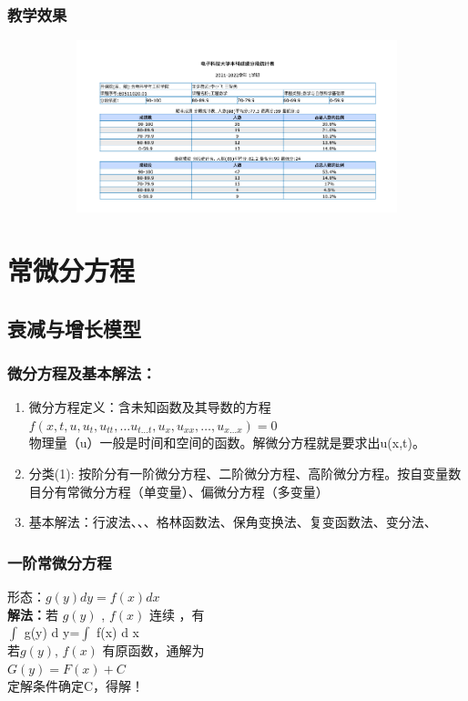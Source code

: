 \begin{frame} [t]
    \frametitle{教学效果}
    \centering
    \includegraphics[width=1.0\textwidth,height=5.0cm]{figs/exam1.png}
\end{frame}

\section{常微分方程}
\subsection{衰减与增长模型}
\begin{frame}
	\frametitle{微分方程及基本解法：}
    \begin{enumerate}
    \item 微分方程定义：含未知函数及其导数的方程 \\
    	$f\left(x,t, u, u_t,u_{tt}, \ldots u_{t \ldots t}, u_{x}, u_{xx}, \ldots, u_{x \ldots x} \right)=0$ \\
    	\vspace{0.5cm}
 		物理量（u）一般是时间和空间的函数。解微分方程就是要求出u(x,t)。
	\item 分类(1): 按阶分有一阶微分方程、二阶微分方程、高阶微分方程。按自变量数目分有常微分方程（单变量）、偏微分方程（多变量） 
    	\vspace{0.5cm}
    \item 基本解法：行波法、{\color{deepred}{分离变量法}}、{\color{deepred}{积分变换法}}、格林函数法、保角变换法、复变函数法、变分法、\color{deepred}{级数展开法}         
    \end{enumerate}
\end{frame}

\begin{frame}
	\frametitle{一阶常微分方程}
	{\large 形态：$g(y)dy=f(x)dx$ }\\ \vspace{0.6cm}
	\textbf{解法：}若 $g(y)$ , $f(x)$ 连续 ，有\\	\vspace{0.3cm}
   	{\large 	$\int$ g(y) d y=$\int$ f(x) d x }\\	\vspace{0.3cm}
	若$g(y)$, $f(x)$  有原函数，通解为\\	\vspace{0.3cm}
	{\large $G(y)=F(x)+C$}\\	\vspace{0.3cm}
	定解条件确定C，得解！
\end{frame}

